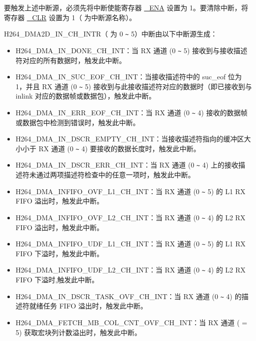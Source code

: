 \documentclass[main\_\_CN.tex]{subfiles}
\begin{document}
要触发上述中断源，必须先将中断使能寄存器 \hyperref[fielddesc:H264DMAMOVE2MBLINEDONEINTENA]{\_ENA} 设置为 1。要清除中断，将寄存器 \hyperref[fielddesc:H264DMAMOVE2MBLINEDONEINTCLR]{\_CLR} 设置为 1（ 为中断源名称）。

\label{int:H264DMAINCHNINT}H264\_DMA2D\_IN\_CH{}\_INTR（ 为 0 \verb+~+ 5）中断由以下中断源生成：

\begin{itemize}
\item \label{int:H264DMAINDONECHNINT}H264\_DMA\_IN\_DONE\_CH{}\_INT：当 RX 通道  (0 \verb+~+ 5) 接收到与接收描述符对应的所有数据时，触发此中断。
\item \label{int:H264DMAINSUCEOFCHNINT}H264\_DMA\_IN\_SUC\_EOF\_CH{}\_INT：当接收描述符中的 suc\_eof 位为 1，并且 RX 通道  (0 \verb+~+ 5) 接收到与此接收描述符对应的数据时（即已接收到与 inlink 对应的数据帧或数据包），触发此中断。
\item \label{int:H264DMAINERREOFCHNINT}H264\_DMA\_IN\_ERR\_EOF\_CH{}\_INT：当 RX 通道  (0 \verb+~+ 4) 接收的数据帧或数据包中检测到错误时，触发此中断。
\item \label{int:H264DMAINDSCREMPTYCHNINT}H264\_DMA\_IN\_DSCR\_EMPTY\_CH{}\_INT：当接收描述符指向的缓冲区大小小于 RX 通道  (0 \verb+~+ 4) 要接收的数据长度时，触发此中断。
\item \label{int:H264DMAINDSCRERRCHNINT}H264\_DMA\_IN\_DSCR\_ERR\_CH{}\_INT：当 RX 通道  (0 \verb+~+ 4) 上的接收描述符未通过两项描述符检查中的任意一项时，触发此中断。
\item \label{int:H264DMAINFIFOOVFL1CHNINT}H264\_DMA\_INFIFO\_OVF\_L1\_CH{}\_INT：当 RX 通道  (0 \verb+~+ 5) 的 L1 RX FIFO 溢出时，触发此中断。
\item \label{int:H264DMAINFIFOOVFL2CHNINT}H264\_DMA\_INFIFO\_OVF\_L2\_CH{}\_INT：当 RX 通道  (0 \verb+~+ 4) 的 L2 RX FIFO 溢出时，触发此中断。
\item \label{int:H264DMAINFIFOUDFL1CHNINT}H264\_DMA\_INFIFO\_UDF\_L1\_CH{}\_INT：当 RX 通道  (0 \verb+~+ 5) 的 L1 RX FIFO 下溢时，触发此中断。
\item \label{int:H264DMAINFIFOUDFL2CHNINT}H264\_DMA\_INFIFO\_UDF\_L2\_CH{}\_INT：当 RX 通道 (0 \verb+~+ 4) 的 L2 RX FIFO 下溢时,触发此中断。
\item \label{int:H264DMAINDSCRTASKOVFCHNINT}H264\_DMA\_IN\_DSCR\_TASK\_OVF\_CH{}\_INT：当 RX 通道 (0 \verb+~+ 4) 的描述符就绪任务 FIFO 溢出时，触发此中断。
\item \label{int:H264DMAFETCHMBCOLCNTOVFCHNINT}H264\_DMA\_FETCH\_MB\_COL\_CNT\_OVF\_CH{}\_INT：当 RX 通道  ( = 5) 获取宏块列计数溢出时，触发此中断。
\end{itemize}
\end{document}
